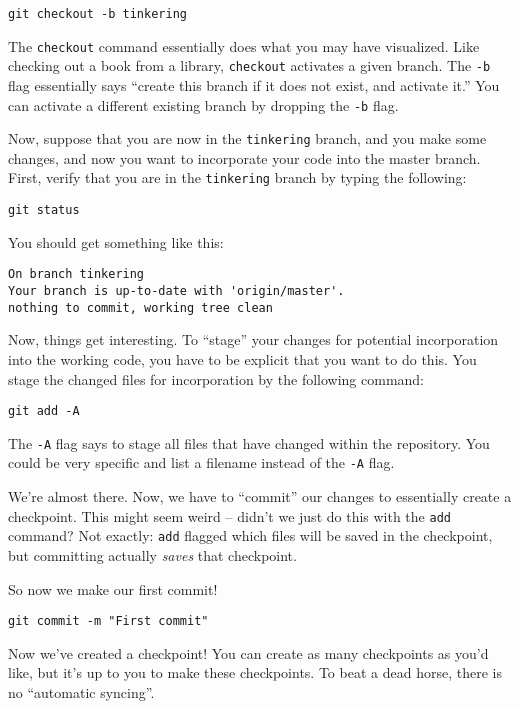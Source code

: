 \documentclass[11pt, oneside]{article}   	%
\begin{document}
\begin{lstlisting}
git checkout -b tinkering
\end{lstlisting}

The \texttt{checkout} command essentially does what you may have visualized. Like checking out a book from a library, \texttt{checkout} activates a given branch. The \texttt{-b} flag essentially says ``create this branch if it does not exist, and activate it.'' You can activate a different existing branch by dropping the \texttt{-b} flag.

Now, suppose that you are now in the \texttt{tinkering} branch, and you make some changes, and now you want to incorporate your code into the master branch. First, verify that you are in the \texttt{tinkering} branch by typing the following:

\begin{lstlisting}
git status
\end{lstlisting}
You should get something like this:
\begin{lstlisting}
On branch tinkering
Your branch is up-to-date with 'origin/master'.
nothing to commit, working tree clean
\end{lstlisting}

Now, things get interesting. To ``stage'' your changes for potential incorporation into the working code, you have to be explicit that you want to do this. You stage the changed files for incorporation by the following command:
\begin{lstlisting}
git add -A
\end{lstlisting}

The \texttt{-A} flag says to stage all files that have changed within the repository. You could be very specific and list a filename instead of the \texttt{-A} flag.

We're almost there. Now, we have to ``commit'' our changes to essentially create a checkpoint. This might seem weird -- didn't we just do this with the \texttt{add} command? Not exactly: \texttt{add} flagged which files will be saved in the checkpoint, but committing actually \textit{saves} that checkpoint.

So now we make our first commit!
\begin{lstlisting}
git commit -m "First commit"
\end{lstlisting}
Now we've created a checkpoint! You can create as many checkpoints as you'd like, but it's up to you to make these checkpoints. To beat a dead horse, there is no ``automatic syncing''.
\end{document}
